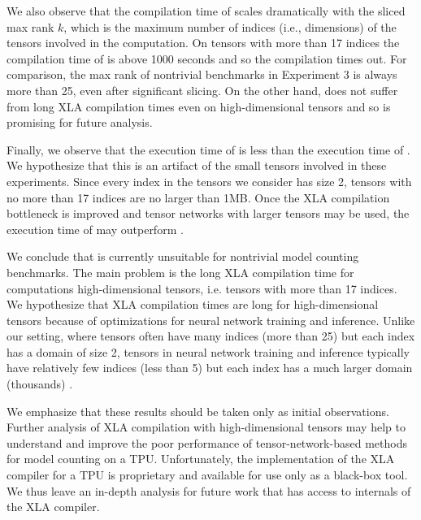 We also observe that the compilation time of  scales dramatically with the sliced max rank $k$, which is the maximum number of indices (i.e., dimensions) of the tensors involved in the computation.
On tensors with more than 17 indices the compilation time of  is above 1000 seconds and so the compilation times out.
For comparison, the max rank of nontrivial benchmarks in Experiment 3 is always more than 25, even after significant slicing.
On the other hand,  does not suffer from long XLA compilation times even on high-dimensional tensors and so is promising for future analysis.

Finally, we observe that the execution time of  is less than the execution time of .
We hypothesize that this is an artifact of the small tensors involved in these experiments. Since every index in the tensors we consider has size 2, tensors with no more than 17 indices are no larger than 1MB.
Once the XLA compilation bottleneck is improved and tensor networks with larger tensors may be used, the execution time of  may outperform .

We conclude that  is currently unsuitable for nontrivial model counting benchmarks. The main problem is the long XLA compilation time for computations high-dimensional tensors, i.e. tensors with more than 17 indices.
We hypothesize that XLA compilation times are long for high-dimensional tensors because of optimizations for neural network training and inference. 
Unlike our setting, where tensors often have many indices (more than 25) but each index has a domain of size 2, tensors in neural network training and inference typically have relatively few indices (less than 5) but each index has a much larger domain (thousands) \cite{kang2012gigatensor,JYPPABBBBB17}.

We emphasize that these results should be taken only as initial observations.
Further analysis of XLA compilation with high-dimensional tensors may help to understand and improve the poor performance of tensor-network-based methods for model counting on a TPU.
Unfortunately, the implementation of the XLA compiler for a TPU is proprietary and available for use only as a black-box tool. 
We thus leave an in-depth analysis for future work that has access to internals of the XLA compiler.
